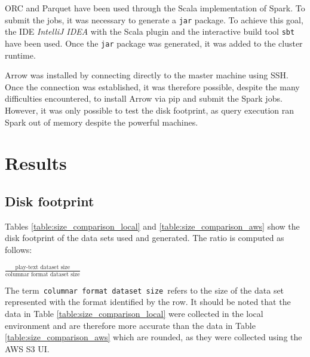 \documentclass[10pt, a4paper]{report}
\begin{document}
ORC and Parquet have been used through the Scala implementation of Spark. To submit the jobs, it was necessary to generate a \texttt{jar} package. To achieve this goal, the IDE \textit{IntelliJ IDEA}\cite{intellij} with the Scala plugin and the interactive build tool \texttt{sbt}\cite{sbt} have been used. Once the \texttt{jar} package was generated, it was added to the cluster runtime.

Arrow was installed by connecting directly to the master machine using SSH. Once the connection was established, it was therefore possible, despite the many difficulties encountered, to install Arrow via pip\cite{pip} and submit the Spark jobs.  However, it was only possible to test the disk footprint, as query execution ran Spark out of memory despite the powerful machines.

\section{Results}

\subsection{Disk footprint}

Tables \ref{table:size_comparison_local} and \ref{table:size_comparison_aws} show the disk footprint of the data sets used and generated. The ratio is computed as follows:

\begin{center}
	$\frac{\text{play-text dataset size}}{\text{columnar format dataset size}}$
\end{center}

The term\texttt{ columnar format dataset size }refers to the size of the data set represented with the format identified by the row. It should be noted that the data in Table \ref{table:size_comparison_local} were collected in the local environment and are therefore more accurate than the data in Table \ref{table:size_comparison_aws} which are rounded, as they were collected using the AWS S3 UI\cite{aws_s3}.
\end{document}

